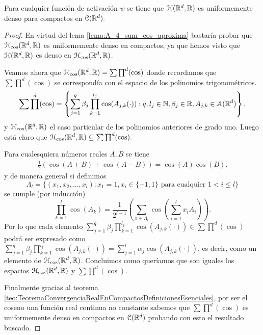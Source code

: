 \begin{lema} \label{lema:A_5_uniformemente_denso_compactos}
    Para cualquier función de activación $\psi$ se tiene que 
    $\mathcal{H}(\mathbb{R}^d,\mathbb{R})$ es uniformemente denso para compactos en $\mathcal{C}(\mathbb{R}^d).$
\end{lema}
\begin{proof}
    En virtud del lema \ref{lema:A_4_sum_cos_aproxima} 
    bastaría probar que $\mathcal{H}_{\cos}(\mathbb{R}^d, \mathbb{R})$ es uniformemente 
    denso en compactos, ya que hemos visto que $\mathcal{H}(\mathbb{R}^d,\mathbb{R})$ 
    es denso en $\mathcal{H}_{\cos}(\mathbb{R}^d, \mathbb{R})$. 

    Veamos ahora que $\mathcal{H}_{\cos}(\mathbb{R}^d, \mathbb{R}) = \sum \prod^d(\cos)$ 
    donde recordamos que $\sum \prod^d(\cos)$ se correspondía
    con el espacio de los polinomios trigonométricos. 
    \begin{equation}
        \sum \prod^d(\cos) = 
        \left\{
            \sum_{j=1}^q \beta_j 
            \prod_{k=1}^{l_j} \cos(A_{j,k}(\cdot)) 
            : q, l_j \in \mathbb{N}, \beta_j \in \mathbb{R}, A_{j,k}\in \mathcal{A}(\mathbb{R}^d)
        \right\},
    \end{equation}
    y  $\mathcal{H}_{\cos}(\mathbb{R}^d, \mathbb{R})$ el caso particular de los polinomios anteriores 
    de grado uno. Luego está claro que $\mathcal{H}_{\cos}(\mathbb{R}^d, \mathbb{R}) \subseteq \sum \prod^d(\cos).$
    
    Para cualesquiera números reales $A,B$
    se tiene 
    \begin{equation}
        \begin{split}
            \frac{1}{2}(\cos(A + B)  + \cos(A - B))
            = \cos(A)\cos(B).
        \end{split} 
    \end{equation}  
    y de manera general si definimos 
    \begin{equation}
        \Lambda_l = \{
            (x_1, x_2, ..., x_l) : 
            x_1 = 1, x_i \in \{-1, 1\} 
            \text{ para cualquier } 1 < i \leq l
        \}
    \end{equation}
    se cumple (por inducción) 
    \begin{equation}
        \prod^l_{k=1} \cos(A_k) = 
        \frac{1}{2^{l-1}} 
        \left( 
            \sum_{x \in \Lambda_l}
            \cos \left(\sum_{i=1}^l x_i A_i \right)
        \right). 
    \end{equation}
    Por lo que cada elemento 
    $\sum_{j=1}^q \beta_j \prod_{k=1}^{l_j} \cos(A_{j,k}(\cdot)) \in \sum \prod^d(\cos)$
    podrá ser expresado como 
    $\sum_{j=1}^q \beta_j \prod_{k=1}^{l_j} \cos(A_{j,k}(\cdot)) = 
    \sum_{j=1}^t \alpha_j \cos(A_{j,k}(\cdot))$, es decir, como un elemento 
    de $\mathcal{H}_{\cos}(\mathbb{R}^d, \mathbb{R})$. Concluimos como queríamos que son iguales
    los espacios
    $\mathcal{H}_{\cos}(\mathbb{R}^d, \mathbb{R})$ y $\sum \prod^d(\cos)$. 

    Finalmente gracias al teorema \ref{teo:TeoremaConvergenciaRealEnCompactosDefinicionesEsenciales},
    por ser  el coseno una función real continua no constante sabemos que 
    $\sum \prod^d(\cos)$ es uniformemente denso en compactos en $\mathcal{C}(\mathbb{R}^d)$ 
    probando con esto el resultado buscado. 
    
\end{proof}

